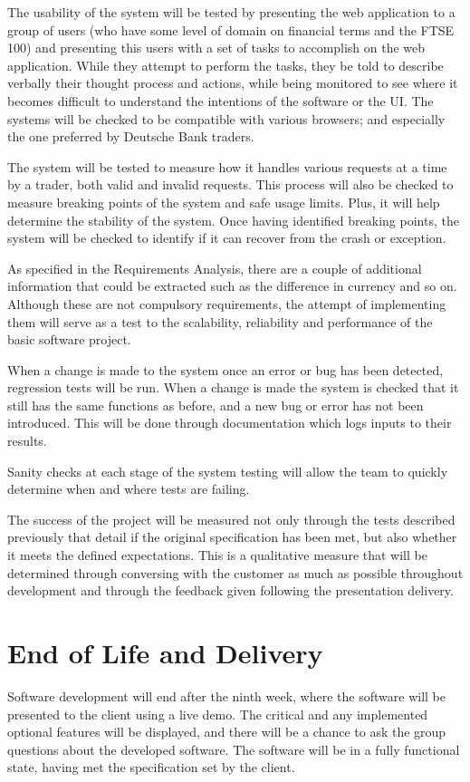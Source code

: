 \documentclass[]{IEEEtran}
\begin{document}
The usability of the system will be tested by presenting the web application to a group of users (who have some level of domain on financial terms and the FTSE 100) and presenting this users with a set of tasks to accomplish on the web application. While they attempt to perform the tasks, they be told to describe verbally their thought process and actions, while being monitored to see where it becomes difficult to understand the intentions of the software or the UI.
The systems will be checked to be compatible with various browsers; and especially the one preferred by Deutsche Bank traders.  

The system will be tested to measure how it handles various requests at a time by a trader, both valid and invalid requests. This process will also be checked to measure breaking points of the system and safe usage limits. Plus, it will help determine the stability of the system. Once having identified breaking points, the system will be checked to identify if it can recover from the crash or exception.

As specified in the Requirements Analysis, there are a couple of additional information that could be extracted such as the difference in currency and so on. Although these are not compulsory requirements, the attempt of implementing them will serve as a test to the scalability, reliability and performance of the basic software project.

When a change is made to the system once an error or bug has been detected, regression tests will be run. When a change is made the system is checked that it still has the same functions as before, and a new bug or error has not been introduced. This will be done through documentation which logs inputs to their results.

Sanity checks at each stage of the system testing will allow the team to quickly determine when and where tests are failing.

The success of the project will be measured not only through the tests described previously that detail if the original specification has been met, but also whether it meets the defined expectations. This is a qualitative measure that will be determined through conversing with the customer as much as possible throughout development and through the feedback given following the presentation delivery. 

\section{End of Life and Delivery}
	Software development will end after the ninth week, where the software will be presented to the client using a live demo. The critical and any implemented optional features will be displayed, and there will be a chance to ask the group questions about the developed software. The software will be in a fully functional state, having met the specification set by the client. 
	
\end{document}
